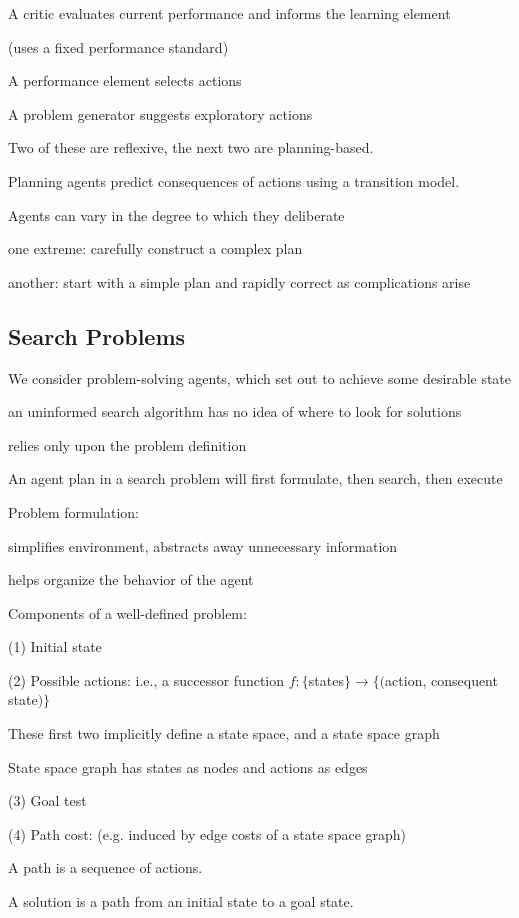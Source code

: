 \documentclass[12pt]{article}
\begin{document}
A critic evaluates current performance and informs the learning element

(uses a fixed performance standard)

A performance element selects actions

A problem generator suggests exploratory actions

\noindent
Two of these are reflexive, the next two are planning-based.

Planning agents predict consequences of actions using a transition model.

\noindent
Agents can vary in the degree to which they deliberate

one extreme: carefully construct a complex plan

another: start with a simple plan and rapidly correct as complications arise

\subsection{Search Problems}

\noindent
We consider problem-solving agents, which set out to achieve some desirable state

an uninformed search algorithm has no idea of where to look for solutions

relies only upon the problem definition

\noindent
An agent plan in a search problem will first formulate, then search, then execute

\noindent
Problem formulation:

simplifies environment, abstracts away unnecessary information

helps organize the behavior of the agent

\noindent
Components of a well-defined problem:

(1) Initial state

(2) Possible actions: i.e., a successor function $f: \{$states$\} \to \{($action, consequent state$)\}$

These first two implicitly define a state space, and a state space graph

State space graph has states as nodes and actions as edges

(3) Goal test

(4) Path cost: (e.g. induced by edge costs of a state space graph)

A path is a sequence of actions.

\noindent
A solution is a path from an initial state to a goal state.
\end{document}
